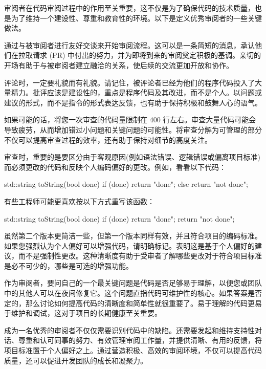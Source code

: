 
审阅者在代码审阅过程中的作用至关重要，这不仅是为了确保代码的技术质量，也是为了维持一个建设性、尊重和教育性的环境。以下是定义优秀审阅者的一些关键做法。


通过与被审阅者进行友好交谈来开始审阅流程。这可以是一条简短的消息，承认他们在拉取请求 (PR) 中付出的努力，并为即将到来的审阅奠定积极的基调。亲切的开场有助于与被审阅者建立融洽的关系，使后续的交流更加开放和协作。


评论时，一定要礼貌而有礼貌。请记住，被评论者已经为他们的程序代码投入了大量精力。批评应该是建设性的，重点是程序代码及其改进，而不是个人。以问题或建议的形式，而不是指令的形式表达反馈，也有助于保持积极和鼓舞人心的语气。


如果可能的话，将您一次审查的代码量限制在 400 行左右。审查大量代码可能会导致疲劳，从而增加错过小问题和关键问题的可能性。将审查分解为可管理的部分不仅可以提高审查过程的效率，还有助于保持对细节的高度关注。


审查时，重要的是要区分由于客观原因(例如语法错误、逻辑错误或偏离项目标准)而必须更改的代码和反映个人编码偏好的更改。例如，看看以下代码：

\begin{cpp}
std::string toString(bool done) {
    if (done) {
        return "done";
    } else {
        return "not done";
    }
}
\end{cpp}

有些工程师可能更喜欢按以下方式重写该函数：

\begin{cpp}
std::string toString(bool done) {
    if (done) {
        return "done";
    }
    return "not done";
}
\end{cpp}

虽然第二个版本更简洁一些，但第一个版本同样有效，并且符合项目的编码标准。如果您强烈认为个人偏好可以增强代码，请明确标记。表明这是基于个人偏好的建议，而不是强制性更改。这种清晰度有助于受审者了解哪些更改对于符合项目标准是必不可少的，哪些是可选的增强功能。


作为审阅者，要问自己的一个最关键问题是代码是否足够易于理解，以便您或团队中的其他人可以在夜间修复它。这个问题直指代码可维护性的核心。如果答案是否定的，那么讨论如何提高代码的清晰度和简单性就很重要了。易于理解的代码更易于维护和调试，这对于项目的长期健康至关重要。

成为一名优秀的审阅者不仅仅需要识别代码中的缺陷。还需要发起和维持支持性对话、尊重和认可同事的努力、有效管理审阅工作量，并提供清晰、有用的反馈，将项目标准置于个人偏好之上。通过营造积极、高效的审阅环境，不仅可以提高代码质量，还可以促进开发团队的成长和凝聚力。



















